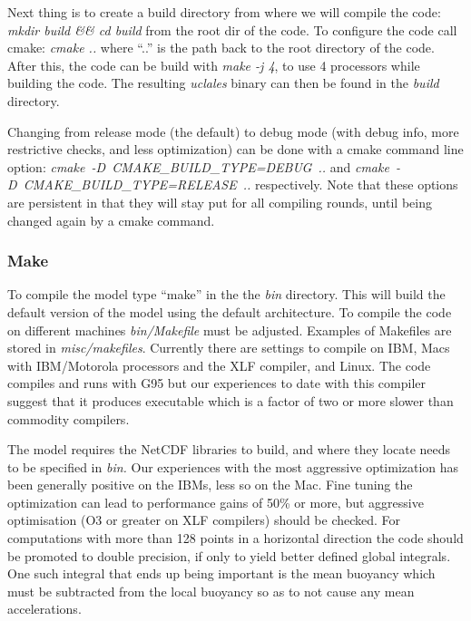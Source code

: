 \documentclass[11pt,a4paper]{article}
\begin{document}
Next thing is to create a build directory from where we will compile the code: \emph{mkdir build \&\& cd build} from the root dir of the code. To configure the code call cmake: \emph{cmake ..} where ``..'' is the path back to the root directory of the code. After this, the code can be build with \emph{make -j 4}, to use 4 processors while building the code. The resulting \emph{uclales} binary can then be found in the \emph{build} directory.

Changing from release mode (the default) to debug mode (with debug info, more restrictive checks, and less optimization) can be done with a cmake command line option: \mbox{\emph{cmake -D CMAKE\_BUILD\_TYPE=DEBUG ..}} and \mbox{\emph{cmake -D CMAKE\_BUILD\_TYPE=RELEASE ..}} respectively. Note that these options are persistent in that they will stay put for all compiling rounds, until being changed again by a cmake command.

\subsubsection{Make}
To compile the model type ``make'' in the the 
\emph{bin} directory. This will build the default version of the model using the default
architecture. To compile the code on different machines \emph{bin/Makefile} 
must be adjusted. Examples of Makefiles are stored in \emph{misc/makefiles}.
Currently there are settings to compile on IBM, Macs with IBM/Motorola processors 
and the XLF compiler, and Linux. The code compiles and runs with G95 but our
experiences to date with this compiler suggest that it produces
executable which is a factor of two or more slower than commodity
compilers.

The model requires the NetCDF libraries to build, and where they
locate needs to be specified in \emph{bin.}  Our experiences with the
most aggressive optimization has been generally positive on the IBMs,
less so on the Mac.  Fine tuning the optimization can lead to
performance gains of 50\% or more, but aggressive optimisation (O3 or
greater on XLF compilers) should be checked.  For computations with
more than 128 points in a horizontal direction the code should be
promoted to double precision, if only to yield better defined global
integrals.  One such integral that ends up being important is the mean
buoyancy which must be subtracted from the local buoyancy so as to not
cause any mean accelerations.
\end{document}
